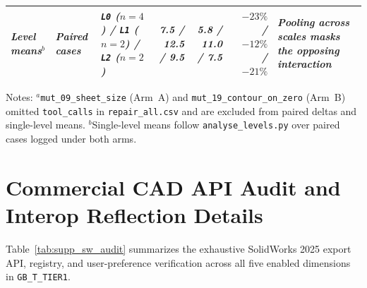 \documentclass[nocopyright,nolists,upint,varvw,hyphenate]{asmejour}
\begin{document}
\begin{table}[t]
\begin{minipage}{\textwidth}
\begin{tabularx}{\textwidth}{L{1.85cm} L{2.05cm} L{3.45cm} r r r Y}
\midrule
\emph{Level means}$^{b}$ & \emph{Paired cases} & \emph{{\upshape\texttt{L0}} ($n=4$) / {\upshape\texttt{L1}} ($n=2$) / {\upshape\texttt{L2}} ($n=2$)} & \emph{7.5 / 12.5 / 9.5} & \emph{5.8 / 11.0 / 7.5} & \emph{$-23\%$ / $-12\%$ / $-21\%$} & \emph{Pooling across scales masks the opposing interaction} \\
\bottomrule
\end{tabularx}
\par\smallskip\footnotesize
Notes: $^{a}$\texttt{mut\_09\_sheet\_size} (Arm~A) and \texttt{mut\_19\_contour\_on\_zero} (Arm~B) omitted \texttt{tool\_calls} in \texttt{repair\_all.csv} and are excluded from paired deltas and single-level means. $^{b}$Single-level means follow \texttt{analyse\_levels.py} over paired cases logged under both arms.
\end{minipage}
\end{table}

\section{Commercial CAD API Audit and Interop Reflection Details}\label{sec:supp_com}

Table~\ref{tab:supp_sw_audit} summarizes the exhaustive SolidWorks 2025 export API, registry, and user-preference verification across all five enabled dimensions in \texttt{GB\_T\_TIER1}.
\end{document}
